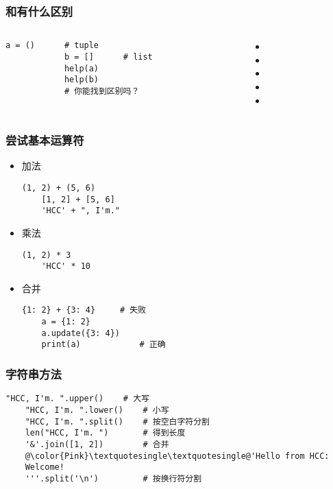 \begin{frame} [fragile]
	\frametitle{和有什么区别}
	\linespread{1.5}
	\begin{columns}[T]
		\begin{column}[T]{.5\textwidth}
			\begin{lstlisting}[style=pythonstyle, gobble=12, texcl]
			a = ()		# tuple
			b = []		# list
			help(a)
			help(b)
			# 你能找到区别吗？
			\end{lstlisting}
		\end{column}
		\begin{column}[T]{.5\textwidth}
			\begin{itemize}
			\item {}
			\item {}
			\item {}
			\item {}
			\item {}
			\end{itemize}
		\end{column}
	\end{columns}
\end{frame}

\begin{frame} [fragile]
	\frametitle{尝试基本运算符}
	\begin{itemize}
	\item 加法
	\begin{lstlisting}[style=pythonstyle, gobble=4, texcl]
	(1, 2) + (5, 6)
	[1, 2] + [5, 6]
	'HCC' + ", I'm."
	\end{lstlisting}
	\item 乘法
	\begin{lstlisting}[style=pythonstyle, gobble=4, texcl]
	(1, 2) * 3
	'HCC' * 10
	\end{lstlisting}
	\item 合并
	\begin{lstlisting}[style=pythonstyle, gobble=4, texcl]
	{1: 2} + {3: 4}		# 失败
	a = {1: 2}
	a.update({3: 4})
	print(a)			# 正确
	\end{lstlisting}
	\end{itemize}
\end{frame}

\begin{frame} [fragile]
	\frametitle{字符串方法}
	\linespread{1.5}
	\begin{lstlisting}[style=pythonstyle, gobble=4, texcl, escapechar=@]
	"HCC, I'm. ".upper()	# 大写
	"HCC, I'm. ".lower()	# 小写
	"HCC, I'm. ".split()	# 按空白字符分割
	len("HCC, I'm. ")		# 得到长度
	'&'.join([1, 2])		# 合并
	@\color{Pink}\textquotesingle\textquotesingle@'Hello from HCC:
	Welcome!
	'''.split('\n')			# 按换行符分割
	\end{lstlisting}
\end{frame}

